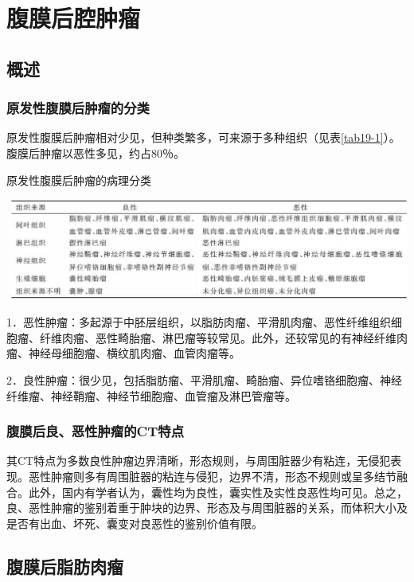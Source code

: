 \section{腹膜后腔肿瘤}

\subsection{概述}

\subsubsection{原发性腹膜后肿瘤的分类}

原发性腹膜后肿瘤相对少见，但种类繁多，可来源于多种组织（见表\ref{tab19-1}）。腹膜后肿瘤以恶性多见，约占80％。

\begin{table}[htbp]
\centering
\caption{原发性腹膜后肿瘤的病理分类}
\label{tab19-1}
\includegraphics[width=\textwidth,height=\textheight,keepaspectratio]{./images/Image00383.jpg}
\end{table}

1．恶性肿瘤：多起源于中胚层组织，以脂肪肉瘤、平滑肌肉瘤、恶性纤维组织细胞瘤、纤维肉瘤、恶性畸胎瘤、淋巴瘤等较常见。此外，还较常见的有神经纤维肉瘤、神经母细胞瘤、横纹肌肉瘤、血管肉瘤等。

2．良性肿瘤：很少见，包括脂肪瘤、平滑肌瘤、畸胎瘤、异位嗜铬细胞瘤、神经纤维瘤、神经鞘瘤、神经节细胞瘤、血管瘤及淋巴管瘤等。

\subsubsection{腹膜后良、恶性肿瘤的CT特点}

其CT特点为多数良性肿瘤边界清晰，形态规则，与周围脏器少有粘连，无侵犯表现。恶性肿瘤则多有周围脏器的粘连与侵犯，边界不清，形态不规则或呈多结节融合。此外，国内有学者认为，囊性均为良性，囊实性及实性良恶性均可见。总之，良、恶性肿瘤的鉴别着重于肿块的边界、形态及与周围脏器的关系，而体积大小及是否有出血、坏死、囊变对良恶性的鉴别价值有限。

\subsection{腹膜后脂肪肉瘤}

